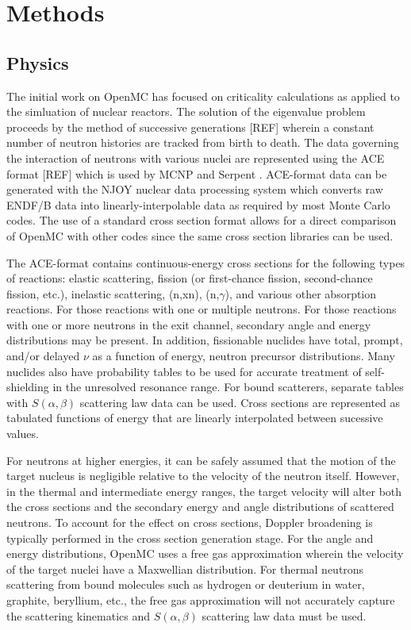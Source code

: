 \documentclass{elsarticle}
\begin{document}
\section{Methods}

\subsection{Physics}

The initial work on OpenMC has focused on criticality calculations as applied to
the simluation of nuclear reactors. The solution of the eigenvalue problem
proceeds by the method of successive generations [REF] wherein a constant number
of neutron histories are tracked from birth to death. The data governing the
interaction of neutrons with various nuclei are represented using the ACE format
[REF] which is used by MCNP \cite{mcnp} and Serpent \cite{serpent}. ACE-format
data can be generated with the NJOY nuclear data processing system which
converts raw ENDF/B data into linearly-interpolable data as required by most
Monte Carlo codes. The use of a standard cross section format allows for a
direct comparison of OpenMC with other codes since the same cross section
libraries can be used.

The ACE-format contains continuous-energy cross sections for the following types
of reactions: elastic scattering, fission (or first-chance fission,
second-chance fission, etc.), inelastic scattering, (n,xn), (n,$\gamma$), and
various other absorption reactions. For those reactions with one or multiple
neutrons. For those reactions with one or more neutrons in the exit channel,
secondary angle and energy distributions may be present. In addition,
fissionable nuclides have total, prompt, and/or delayed $\nu$ as a function of
energy, neutron precursor distributions. Many nuclides also have probability
tables to be used for accurate treatment of self-shielding in the unresolved
resonance range. For bound scatterers, separate tables with $S(\alpha,\beta)$
scattering law data can be used. Cross sections are represented as tabulated
functions of energy that are linearly interpolated between sucessive values.

For neutrons at higher energies, it can be safely assumed that the motion of the
target nucleus is negligible relative to the velocity of the neutron
itself. However, in the thermal and intermediate energy ranges, the target
velocity will alter both the cross sections and the secondary energy and angle
distributions of scattered neutrons. To account for the effect on cross
sections, Doppler broadening is typically performed in the cross section
generation stage. For the angle and energy distributions, OpenMC uses a free gas
approximation \cite{freegas} wherein the velocity of the target nuclei have a
Maxwellian distribution. For thermal neutrons scattering from bound molecules
such as hydrogen or deuterium in water, graphite, beryllium, etc., the free gas
approximation will not accurately capture the scattering kinematics and
$S(\alpha,\beta)$ scattering law data must be used.
\end{document}
